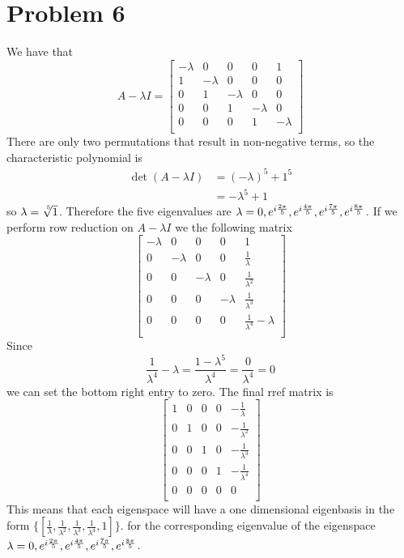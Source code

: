 \section*{Problem 6}
We have that
\[
A-\lambda I =
\begin{bmatrix}
    -\lambda & 0 & 0 & 0 & 1 \\
    1 & -\lambda & 0 & 0 & 0 \\
    0 & 1 & -\lambda & 0 & 0 \\
    0 & 0 & 1 & -\lambda & 0 \\
    0 & 0 & 0 & 1 & -\lambda \\
\end{bmatrix}
\]
There are only two permutations
that result in non-negative terms, 
so the characteristic polynomial is
\begin{align}
    \det(A-\lambda I)
    &= (-\lambda)^5 + 1^5 \\
    &= -\lambda^5 + 1
\end{align}
so $\lambda = \sqrt[\leftroot{-2}\uproot{2}5]{1}$.
Therefore the five eigenvalues are
$\lambda = 0, e^{i\frac{2\pi}{5}}, e^{i\frac{4\pi}{5}},
 e^{i\frac{7\pi}{5}}, e^{i\frac{8\pi}{5}}$.
If we perform row reduction on $A-\lambda I$ we the following matrix
\[
\begin{bmatrix}
    -\lambda & 0 & 0 & 0 & 1 \\
    0 & -\lambda & 0 & 0 & \frac{1}{\lambda} \\
    0 & 0 & -\lambda & 0 & \frac{1}{\lambda^2} \\
    0 & 0 & 0 & -\lambda & \frac{1}{\lambda^3} \\
    0 & 0 & 0 & 0 & \frac{1}{\lambda^4} - \lambda\\
\end{bmatrix}
\]
Since 
\[
    \frac{1}{\lambda^4} - \lambda = \frac{1 - \lambda^5}{\lambda^4} = \frac{0}{\lambda^4} = 0
\]
we can set the bottom right entry to zero. The final rref matrix is 
\[
\begin{bmatrix}
    1 & 0 & 0 & 0 & -\frac{1}{\lambda} \\
    0 & 1 & 0 & 0 & -\frac{1}{\lambda^2} \\
    0 & 0 & 1 & 0 & -\frac{1}{\lambda^3} \\
    0 & 0 & 0 & 1 & -\frac{1}{\lambda^4} \\
    0 & 0 & 0 & 0 & 0\\
\end{bmatrix}
\]
This means that each eigenspace will have a one dimensional eigenbasis in the form
$\{\left[ \frac{1}{\lambda}, \frac{1}{\lambda^2}, \frac{1}{\lambda^3}, \frac{1}{\lambda^4}, 1 \right]\}$.
for the corresponding eigenvalue of the eigenspace $\lambda = 0, e^{i\frac{2\pi}{5}}, e^{i\frac{4\pi}{5}},
e^{i\frac{7\pi}{5}}, e^{i\frac{8\pi}{5}}$.
